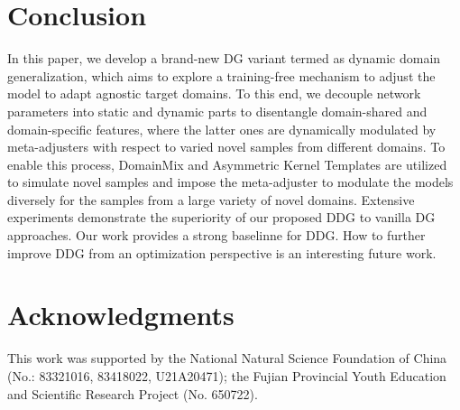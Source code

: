 \documentclass{article}
\begin{document}
\section{Conclusion}
In this paper, we develop a brand-new DG variant termed as dynamic domain generalization, which aims to explore a training-free mechanism to adjust the model to adapt agnostic target domains. To this end, we decouple network parameters into static and dynamic parts to disentangle domain-shared and domain-specific features, where the latter ones are dynamically modulated by meta-adjusters with respect to varied novel samples from different domains. To enable this process, DomainMix and Asymmetric Kernel Templates are utilized to simulate novel samples and impose the meta-adjuster to modulate the models diversely for the samples from a large variety of novel domains. Extensive experiments demonstrate the superiority of our proposed DDG to vanilla DG approaches. Our work provides a strong baselinne for DDG. How to further improve DDG from an optimization perspective is an interesting future work. 




\clearpage


\section*{Acknowledgments}


This work was supported by the National Natural Science Foundation of China (No.: 83321016, 83418022, U21A20471); the Fujian Provincial Youth Education and Scientific Research Project (No. 650722).
\end{document}

